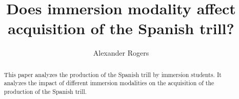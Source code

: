 \title{Does immersion modality affect acquisition of the Spanish trill?}
\author{Alexander Rogers}


\maketitle

\begin{abstract}
This paper analyzes the production of the Spanish trill by immersion students. It analyzes the impact of different immersion modalities on the acquisition of the production of the Spanish trill.
\end{abstract}


